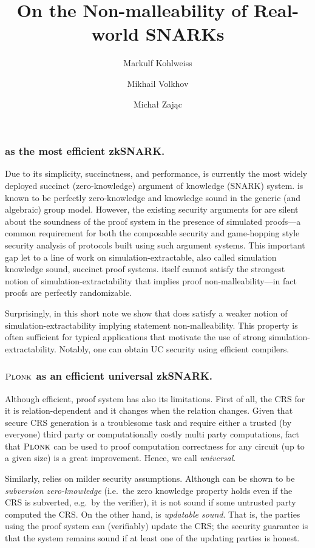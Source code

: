 \documentclass[runningheads,11pt]{llncs}
\title{On the Non-malleability of Real-world SNARKs}
\author{Markulf Kohlweiss\inst{1,2} \and Mikhail Volkhov\inst{1} \and Michał Zając\inst{3}}
\institute{University of Edinburgh, Edinburgh, UK \and IOHK \\ \email{mkohlwei@inf.ed.ac.uk}, \email{mikhail.volkhov@ed.ac.uk} \and Clearmatics, London UK \\ \email{m.p.zajac@gmail.com}}
\begin{document}
	\maketitle
	
	\subsubsection*{\groth{} as the most efficient zkSNARK.}
	Due to its simplicity, succinctness, and performance, \groth{} is
  currently the most widely deployed succinct (zero-knowledge) argument of
  knowledge (SNARK) system. \groth{} is known to be perfectly zero-knowledge and knowledge sound in the generic (and algebraic) group model. However, the existing security arguments for \groth{} are silent about the soundness of the proof system in the presence of simulated proofs---a common requirement for both the composable security and game-hopping style security analysis of protocols built using such argument systems. This important gap let to a line of work on simulation-extractable, also called simulation knowledge sound, succinct proof systems. \groth{} itself cannot satisfy the strongest
  notion of simulation-extractability that implies proof
  non-malleability---in fact proofs are perfectly randomizable.

  Surprisingly, in this short note we show that \groth{} does satisfy a
  weaker notion of simulation-extractability implying statement
  non-malleability. This property is often sufficient for typical
  applications that motivate the use of strong
  simulation-extractability. Notably, one can obtain UC security using
  efficient compilers.
	
	\subsubsection*{$\textsc{Plonk}$ as an efficient universal zkSNARK.}
	Although efficient, \groth{} proof system has also its limitations. First of all, the CRS for it is relation-dependent and it changes when the relation changes. Given that secure CRS generation is a troublesome task and require either a trusted (by everyone) third party or computationally costly multi party computations, fact that $\textsc{Plonk}$ can be used to proof computation correctness for any circuit (up to a given size) is a great improvement. Hence, we call \plonk{} \emph{universal}.
	
	Similarly, \plonk{} relies on milder security assumptions. 
	Although \groth{} can be shown to be \emph{subversion zero-knowledge} (i.e.~the zero knowledge property holds even if the CRS is subverted, e.g.~by the verifier), it is not sound if some untrusted party computed the CRS. 
	On the other hand, \plonk{} is \emph{updatable sound}. That is, the parties using the proof system can (verifiably) update the CRS; the security guarantee is that the system remains sound if at least one of the updating parties is honest.
	
\end{document}
